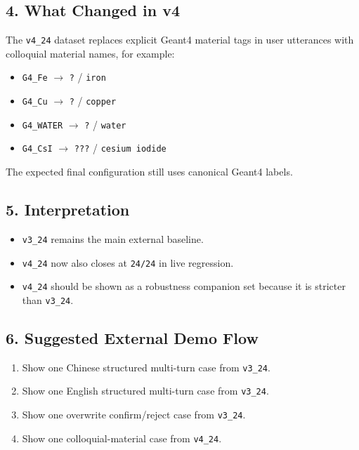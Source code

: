 \documentclass[11pt,a4paper]{ctexart}
\begin{document}
\subsection*{4. What Changed in v4}
The \texttt{v4\_24} dataset replaces explicit Geant4 material tags in user utterances with colloquial material names, for example:
\begin{itemize}
\item \texttt{G4\_Fe} $\rightarrow$ \texttt{?} / \texttt{iron}
\item \texttt{G4\_Cu} $\rightarrow$ \texttt{?} / \texttt{copper}
\item \texttt{G4\_WATER} $\rightarrow$ \texttt{?} / \texttt{water}
\item \texttt{G4\_CsI} $\rightarrow$ \texttt{???} / \texttt{cesium iodide}
\end{itemize}
The expected final configuration still uses canonical Geant4 labels.
\subsection*{5. Interpretation}
\begin{itemize}
\item \texttt{v3\_24} remains the main external baseline.
\item \texttt{v4\_24} now also closes at \texttt{24/24} in live regression.
\item \texttt{v4\_24} should be shown as a robustness companion set because it is stricter than \texttt{v3\_24}.
\end{itemize}
\subsection*{6. Suggested External Demo Flow}
\begin{enumerate}
\item Show one Chinese structured multi-turn case from \texttt{v3\_24}.
\item Show one English structured multi-turn case from \texttt{v3\_24}.
\item Show one overwrite confirm/reject case from \texttt{v3\_24}.
\item Show one colloquial-material case from \texttt{v4\_24}.
\end{enumerate}
\end{document}
